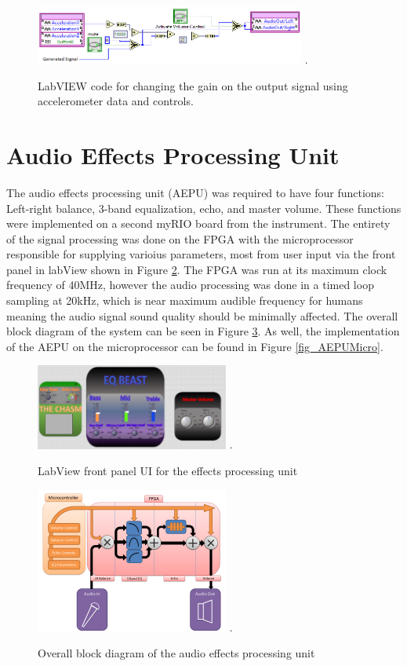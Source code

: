 \begin{figure}[!t]
\centering
\includegraphics[width=3.5in]{AccelerometerVolume.png}
\DeclareGraphicsExtensions.
\caption{LabVIEW code for changing the gain on the output signal using accelerometer data and controls.}
\label{fig_accvol}
\end{figure} 




\section{Audio Effects Processing Unit}
The audio effects processing unit (AEPU) was required to have four functions: Left-right balance, 3-band equalization, echo, and master volume. 
These functions were implemented on a second myRIO board from the instrument.
The entirety of the signal processing was done on the FPGA with the microprocessor responsible for supplying varioius parameters, most from user input via the front panel in labView shown in Figure \ref{fig_AEPUfp}.
The FPGA was run at its maximum clock frequency of 40MHz, however the audio processing was done in a timed loop sampling at 20kHz, which is near maximum audible frequency for humans meaning the audio signal sound quality should be minimally affected. 
The overall block diagram of the system can be seen in Figure \ref{fig_AEPUBlock}.
As well, the implementation of the AEPU on the microprocessor can be found in Figure \ref{fig_AEPUMicro}.

\begin{figure}[!t]
\centering
\includegraphics[width=2.5in]{frontpanel.png}
\DeclareGraphicsExtensions.
\caption{LabView front panel UI for the effects processing unit}
\label{fig_AEPUfp}
\end{figure}

\begin{figure}[!t]
\centering
\includegraphics[width=2.5in]{aepublock.png}
\DeclareGraphicsExtensions.
\caption{Overall block diagram of the audio effects processing unit}
\label{fig_AEPUBlock}
\end{figure}



